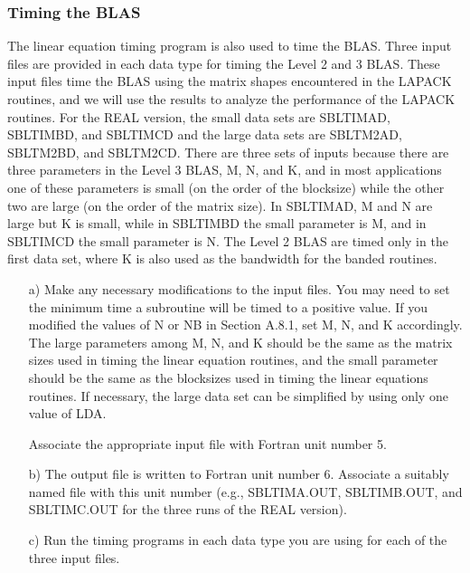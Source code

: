 \subsubsection{Timing the BLAS}

\dent
The linear equation timing program is also used to time the BLAS.
Three input files are provided in each data type for timing the Level
2 and 3 BLAS. 
These input files time the BLAS using the matrix shapes encountered
in the LAPACK routines, and we will use the results to analyze the
performance of the LAPACK routines. 
For the REAL version, the small data sets are
SBLTIMAD, SBLTIMBD, and SBLTIMCD and
the large data sets are
SBLTM2AD, SBLTM2BD, and SBLTM2CD.
There are three sets of inputs because there are three
parameters in the Level 3 BLAS, M, N, and K, and
in most applications one of these parameters is small (on the order
of the blocksize) while the other two are large (on the order of the
matrix size).  
In SBLTIMAD, M and N are large but K is
small, while in SBLTIMBD the small parameter is M, and
in SBLTIMCD the small parameter is N.  
The Level 2 BLAS are timed only in the first data set, where K
is also used as the bandwidth for the banded routines.

\begin{itemize}

\item[a)]
Make any necessary modifications to the input files. 
You may need to set the minimum time a subroutine will 
be timed to a positive value.
If you modified the values of N or NB 
in Section A.8.1, set M, N, and K accordingly. 
The large parameters among M, N, and K
should be the same as the matrix sizes used in timing the linear
equation routines,
and the small parameter should be the same as the
blocksizes used in timing the linear equations routines.
If necessary, the large data set can be simplified by using only one
value of LDA.

Associate the appropriate input file with Fortran unit number 5.

\item[b)]
The output file is written to Fortran unit number 6. 
Associate a suitably named file with this unit number
(e.g., SBLTIMA.OUT, SBLTIMB.OUT, and SBLTIMC.OUT
for the three runs of the REAL version).

\item[c)]
Run the timing programs in each data type you are using for
each of the three input files.

\end{itemize}



